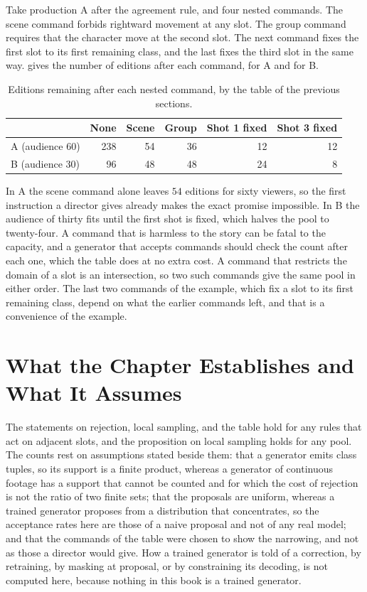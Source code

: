 \documentclass[11pt,twoside,openright]{book}
\theoremstyle{plain}
\theoremstyle{definition}
\theoremstyle{remark}
\begin{document}
Take production A after the agreement rule, and four nested commands. The scene command forbids rightward movement at any slot. The group command requires that the character move at the second slot. The next command fixes the first slot to its first remaining class, and the last fixes the third slot in the same way.  gives the number of editions after each command, for A and for B.

\begin{table}[ht]
\centering
\begin{tabular}{@{}lrrrrr@{}}
\toprule
 & None & Scene & Group & Shot 1 fixed & Shot 3 fixed\\
\midrule
A (audience 60) & 238 & 54 & 36 & 12 & 12\\
B (audience 30) & 96 & 48 & 48 & 24 & 8\\
\bottomrule
\end{tabular}
\caption{Editions remaining after each nested command, by the table of the previous sections.}\label{tab:cmd16}
\end{table}

In A the scene command alone leaves $54$ editions for sixty viewers, so the first instruction a director gives already makes the exact promise impossible. In B the audience of thirty fits until the first shot is fixed, which halves the pool to twenty-four. A command that is harmless to the story can be fatal to the capacity, and a generator that accepts commands should check the count after each one, which the table does at no extra cost. A command that restricts the domain of a slot is an intersection, so two such commands give the same pool in either order. The last two commands of the example, which fix a slot to its first remaining class, depend on what the earlier commands left, and that is a convenience of the example.

\section{What the Chapter Establishes and What It Assumes}\label{sec:limits16}

The statements on rejection, local sampling, and the table hold for any rules that act on adjacent slots, and the proposition on local sampling holds for any pool. The counts rest on assumptions stated beside them: that a generator emits class tuples, so its support is a finite product, whereas a generator of continuous footage has a support that cannot be counted and for which the cost of rejection is not the ratio of two finite sets; that the proposals are uniform, whereas a trained generator proposes from a distribution that concentrates, so the acceptance rates here are those of a naive proposal and not of any real model; and that the commands of the table were chosen to show the narrowing, and not as those a director would give. How a trained generator is told of a correction, by retraining, by masking at proposal, or by constraining its decoding, is not computed here, because nothing in this book is a trained generator.
\end{document}
